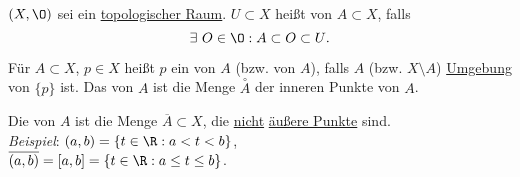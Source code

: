 \begin{definition}[Umgebung]\label{def:umgebung}
  \( (X, \O) \) sei ein \hyperref[def:topologie]{topologischer Raum}. \( U \subset X \) heißt  von \( A \subset X \), falls
  \begin{equation*}
    \exists \ O \in \O : A \subset O \subset U\text{.}
  \end{equation*}
\end{definition}

\begin{definition}\label{def:innereraeussererpunkt}
  Für \( A \subset X \), \( p \in X \) heißt \( p \) ein  von \( A \) (bzw.  von \( A \)), falls \( A \) (bzw. \( X \setminus A \)) \hyperref[def:umgebung]{Umgebung} von \( \{ p \} \) ist. Das  von \( A \) ist die Menge \( \overset{\circ}{A} \) der inneren Punkte von \( A \).
\end{definition}

\begin{definition}
  Die  von \( A \) ist die Menge \( \overline{A} \subset X \), die \underline{nicht} \hyperref[def:innereraeussererpunkt]{äußere Punkte} sind. \\
  \emph{Beispiel}: \( (a, b) = \{ t \in \R : a < t < b \} \), \\ \( \overline{(a,b)} = [a,b] = \{ t \in \R : a \leq t \leq b \} \).
\end{definition}

